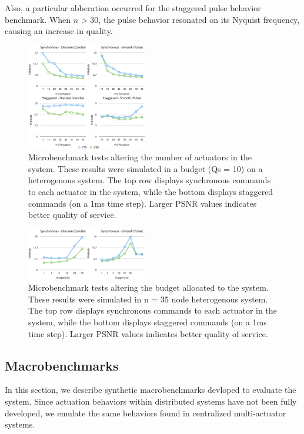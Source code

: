 \documentclass{sigchi}
\begin{document}
  Also, a particular abberation occurred for the staggered pulse behavior benchmark. When $n$ > 30, the pulse behavior resonated on its Nyquist frequency, causing an increase in quality.




  \begin{figure}[t]
      \centering
      \includegraphics[keepaspectratio, width=0.47\textwidth]{figures/pulse_actuators.pdf}
      \caption{ Microbenchmark tests altering the number of actuators in the system. These results were simulated in a budget (Qs = 10) on a heterogenous system. The top row displays synchronous commands to each actuator in the system, while the bottom displays staggered commands (on a 1ms time step). Larger PSNR values indicates better quality of service.  }
        \label{fig:pulse_actuators} 
    \end{figure}

     \begin{figure}[t]
      \centering
      \includegraphics[keepaspectratio, width=0.47\textwidth]{figures/micro_system.pdf}
      \caption{ Microbenchmark tests altering the budget allocated to the system.  These results were simulated in n = 35 node heterogenous system. The top row displays synchronous commands to each actuator in the system, while the bottom displays staggered commands (on a 1ms time step). Larger PSNR values indicates better quality of service.  }
        \label{fig:micro_system} 
    \end{figure}

    \subsection{Macrobenchmarks}
  In this section, we describe synthetic macrobenchmarks devloped to evaluate the system. Since actuation behaviors within distributed systems have not been fully developed, we emulate the same behaviors found in centralized multi-actuator systems. 
\end{document}
